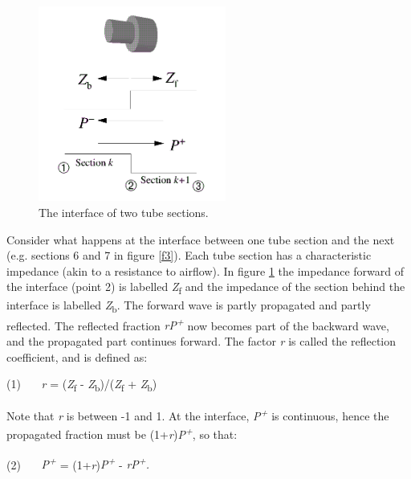 \newpage

\begin{figure}[htbp]
\begin{center}
\includegraphics[width=0.55\textwidth]{mp/img/section-interface.png}
\caption{The interface of two tube sections.}
\label{f4}
\end{center}
\end{figure}

Consider what happens at the interface between one tube section and the next (e.g. sections 6 and 7 in figure \ref{f3}). Each tube section has a characteristic impedance (akin to a resistance to airflow). In figure \ref{f4} the impedance forward of the interface (point 2) is labelled \textit{Z}\textsubscript{f} and the impedance of the section behind the interface is labelled \textit{Z}\textsubscript{b}. The forward wave is partly propagated and partly reflected. The reflected fraction \textit{rP\textsuperscript{+}} now becomes part of the backward wave, and the propagated part continues forward. The factor \textit{r} is called the reflection coefficient, and is defined as:

\bigskip

(1)~~~ \textit{r} = (\textit{Z}\textsubscript{f} - \textit{Z}\textsubscript{b})/(\textit{Z}\textsubscript{f} + \textit{Z}\textsubscript{b})

\bigskip

Note that \textit{r} is between -1 and 1. At the interface, \textit{P\textsuperscript{+}} is continuous, hence the propagated fraction must be (1+\textit{r})\textit{P\textsuperscript{+}}, so that:

\bigskip

(2)~~~ \textit{P\textsuperscript{+}} = (1+\textit{r})\textit{P\textsuperscript{+}} - \textit{rP\textsuperscript{+}.}

